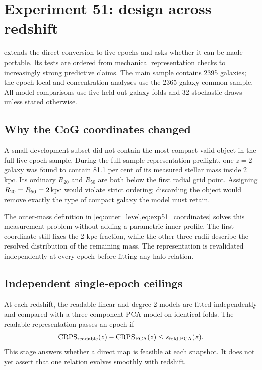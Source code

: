 \section{Experiment 51: design across redshift}
\label{sec:exp51_methods}

\ExpFiftyOne{} extends the direct conversion to five epochs and asks whether it
can be made portable. Its tests are ordered from mechanical representation
checks to increasingly strong predictive claims. The main sample contains 2395
galaxies; the epoch-local and concentration analyses use the 2365-galaxy common
sample. All model comparisons use five held-out galaxy folds and 32 stochastic
draws unless stated otherwise.

\subsection{Why the CoG coordinates changed}

A small development subset did not contain the most compact valid object in the
full five-epoch sample. During the full-sample representation preflight, one
$z=2$ galaxy was found to contain 81.1 per cent of its measured stellar mass
inside 2 kpc. Its ordinary $R_{20}$ and $R_{50}$ are both below the first radial
grid point. Assigning $R_{20}=R_{50}=2\,\mathrm{kpc}$ would violate strict ordering;
discarding the object would remove exactly the type of compact galaxy the model
must retain.

The outer-mass definition in \cref{eq:outer_level,eq:exp51_coordinates} solves
this measurement problem without adding a parametric inner profile. The first
coordinate still fixes the 2-kpc fraction, while the other three radii describe
the resolved distribution of the remaining mass. The representation is
revalidated independently at every epoch before fitting any halo relation.

\subsection{Independent single-epoch ceilings}

At each redshift, the readable linear and degree-2 models are fitted
independently and compared with a three-component PCA model on identical folds.
The readable representation passes an epoch if
\begin{equation}
  \mathrm{CRPS}_{\rm readable}(z)-\mathrm{CRPS}_{\rm PCA}(z)
  \leq s_{\rm fold,PCA}(z).
  \label{eq:exp51_parity_gate}
\end{equation}
This stage answers whether a direct map is feasible at each snapshot. It does
not yet assert that one relation evolves smoothly with redshift.

